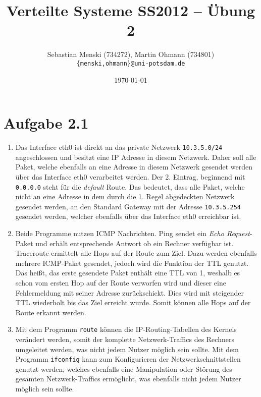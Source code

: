 \documentclass[german,12pt,a4paper]{article}
\begin{document}
\title{\textbf{Verteilte Systeme SS2012 -- Übung 2}}
\author{Sebastian Menski (734272), Martin Ohmann (734801) \\ \texttt{\{menski,ohmann\}@uni-potsdam.de}}
\date{\today}

\maketitle

\section*{Aufgabe 2.1}

\begin{enumerate}

	\item Das Interface eth0 ist direkt an das private Netzwerk \texttt{10.3.5.0/24} angeschlossen und
	besitzt eine IP Adresse in diesem Netzwerk. Daher soll alle Paket, welche ebenfalls an eine
	Adresse in diesem Netzwerk gesendet werden über das Interface eth0 verarbeitet werden. Der 2.
	Eintrag, beginnend mit \texttt{0.0.0.0} steht für die \textit{default} Route. Das bedeutet, dass
	alle Paket, welche nicht an eine Adresse in dem durch die 1. Regel abgedeckten Netzwerk gesendet
	werden, an den Standard Gateway mit der Adresse \texttt{10.3.5.254} gesendet werden, welcher
	ebenfalls über das Interface eth0 erreichbar ist.

	\item Beide Programme nutzen ICMP Nachrichten. Ping sendet ein \textit{Echo Request}-Paket und
	erhält entsprechende Antwort ob ein Rechner verfügbar ist. Traceroute ermittelt alle Hops auf der
	Route zum Ziel. Dazu werden ebenfalls mehrere ICMP-Paket gesendet, jedoch wird die Funktion der
	TTL genutzt. Das heißt, das erste gesendete Paket enthält eine TTL von 1, weshalb es schon vom
	ersten Hop auf der Route verworfen wird und dieser eine Fehlermeldung mit seiner Adresse
	zurückschickt. Dies wird mit steigender TTL wiederholt bis das Ziel erreicht wurde. Somit können
	alle Hops auf der Route erkannt werden.

	\item Mit dem Programm \texttt{route} können die IP-Routing-Tabellen des Kernels verändert werden,
	somit der komplette Netzwerk-Traffics des Rechners umgeleitet werden, was nicht jedem Nutzer
	möglich sein sollte. Mit dem Programm \texttt{ifconfig} kann zum Konfigurieren der
	Netzwerkschnittstellen genutzt werden, welches ebenfalls eine Manipulation oder Störung des
	gesamten Netzwerk-Traffics ermöglicht, was ebenfalls nicht jedem Nutzer möglich sein sollte.

\end{enumerate}
\end{document}
